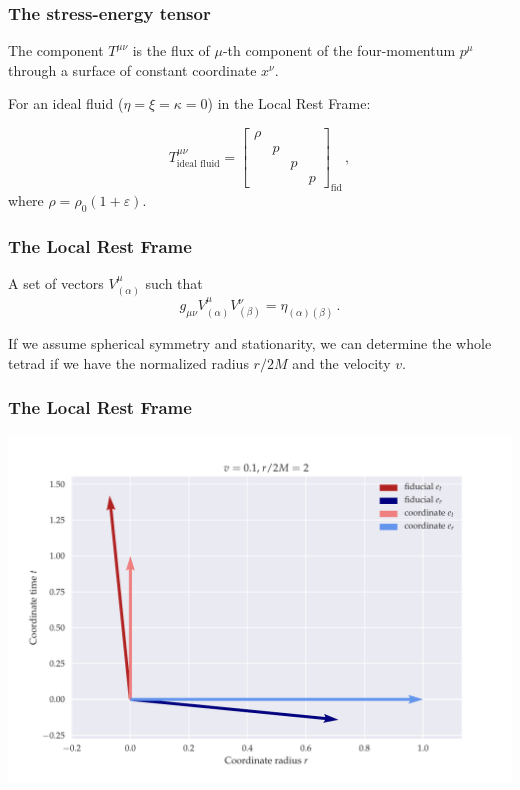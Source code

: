 \documentclass{beamer}
\begin{document}
\begin{frame}
    \frametitle{The stress-energy tensor}

    The component \(T^{\mu\nu}\) is the flux of \(\mu\)-th component of the four-momentum \(p^\mu\) through a surface of constant coordinate \(x^\nu\).

    For an ideal fluid (\(\eta = \xi = \kappa = 0\)) in the Local Rest Frame:

    \begin{equation*}
        T^{\mu\nu}_{\text{ideal fluid}} =
        \begin{bmatrix}
        \rho   &   &   &  \\
           & p  &   &  \\
           &   & p  &  \\
           &   &   & p
       \end{bmatrix}_{\text{fid}} \,,
    \end{equation*}
    where \(\rho = \rho_0 (1 + \varepsilon)\).
\end{frame}

\begin{frame}
    \frametitle{The Local Rest Frame}

    A set of vectors \(V^\mu _{(\alpha)}\)  such that
    \begin{equation*}
        g_{\mu\nu} V^\mu _{(\alpha)} V^\nu _{(\beta)} = \eta_{(\alpha) (\beta)}\,.
    \end{equation*}

    If we assume spherical symmetry and stationarity, we can determine the whole tetrad if we have the normalized radius \(r/2M\) and the velocity \(v\).

\end{frame}

\begin{frame}
    \frametitle{The Local Rest Frame}
        \includegraphics[width=\textwidth]{figures/low_speed}
\end{frame}
\end{document}
